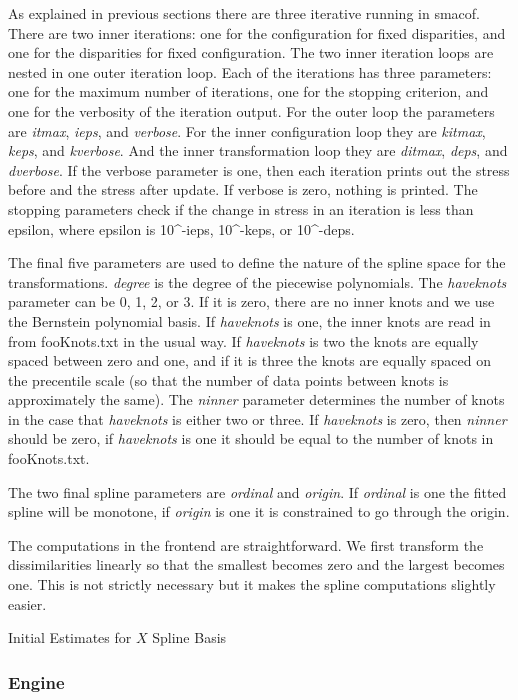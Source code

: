 \documentclass[
  12pt,
]{article}
\begin{document}
As explained in previous sections there are three iterative running in
smacof. There are two inner iterations: one for the configuration for
fixed disparities, and one for the disparities for fixed configuration.
The two inner iteration loops are nested in one outer iteration loop.
Each of the iterations has three parameters: one for the maximum number
of iterations, one for the stopping criterion, and one for the verbosity
of the iteration output. For the outer loop the parameters are \emph{itmax},
\emph{ieps}, and \emph{verbose}. For the inner configuration loop they are
\emph{kitmax}, \emph{keps}, and \emph{kverbose}. And the inner transformation loop they
are \emph{ditmax}, \emph{deps}, and \emph{dverbose}. If the verbose parameter is one,
then each iteration prints out the stress before and the stress after
update. If verbose is zero, nothing is printed. The stopping parameters
check if the change in stress in an iteration is less than epsilon,
where epsilon is 10\^{}-ieps, 10\^{}-keps, or 10\^{}-deps.

The final five parameters are used to define the nature of the spline
space for the transformations. \emph{degree} is the degree of the piecewise
polynomials. The \emph{haveknots} parameter can be 0, 1, 2, or 3. If it is
zero, there are no inner knots and we use the Bernstein polynomial
basis. If \emph{haveknots} is one, the inner knots are read in from
fooKnots.txt in the usual way. If \emph{haveknots} is two the knots are
equally spaced between zero and one, and if it is three the knots are
equally spaced on the precentile scale (so that the number of data
points between knots is approximately the same). The \emph{ninner} parameter
determines the number of knots in the case that \emph{haveknots} is either
two or three. If \emph{haveknots} is zero, then \emph{ninner} should be zero, if
\emph{haveknots} is one it should be equal to the number of knots in
fooKnots.txt.

The two final spline parameters are \emph{ordinal} and \emph{origin}. If \emph{ordinal}
is one the fitted spline will be monotone, if \emph{origin} is one it is
constrained to go through the origin.

The computations in the frontend are straightforward. We first transform
the dissimilarities linearly so that the smallest becomes zero and the
largest becomes one. This is not strictly necessary but it makes the
spline computations slightly easier.

Initial Estimates for \(X\) Spline Basis

\subsubsection{Engine}\label{engine}
\end{document}
